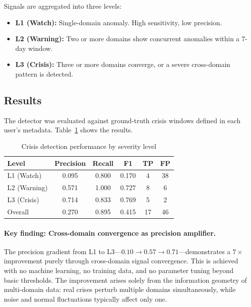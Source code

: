 \documentclass[11pt,a4paper]{article}
\begin{document}
Signals are aggregated into three levels:

\begin{itemize}[leftmargin=*,itemsep=2pt]
  \item \textbf{L1 (Watch):} Single-domain anomaly. High sensitivity,
    low precision.
  \item \textbf{L2 (Warning):} Two or more domains show concurrent
    anomalies within a 7-day window.
  \item \textbf{L3 (Crisis):} Three or more domains converge, or a
    severe cross-domain pattern is detected.
\end{itemize}

\subsection{Results}

The detector was evaluated against ground-truth crisis windows defined in
each user's metadata. Table~\ref{tab:crisis} shows the results.

\begin{table}[H]
\centering
\caption{Crisis detection performance by severity level}
\label{tab:crisis}
\begin{tabular}{lccccc}
\toprule
\textbf{Level} & \textbf{Precision} & \textbf{Recall} & \textbf{F1} & \textbf{TP} & \textbf{FP} \\
\midrule
L1 (Watch)   & 0.095 & 0.800 & 0.170 & 4  & 38 \\
L2 (Warning) & 0.571 & 1.000 & 0.727 & 8  & 6  \\
L3 (Crisis)  & 0.714 & 0.833 & 0.769 & 5  & 2  \\
\midrule
Overall      & 0.270 & 0.895 & 0.415 & 17 & 46 \\
\bottomrule
\end{tabular}
\end{table}

\paragraph{Key finding: Cross-domain convergence as precision amplifier.}
The precision gradient from L1 to L3---$0.10 \to 0.57 \to 0.71$---demonstrates
a $7\times$ improvement purely through cross-domain signal convergence. This is
achieved with no machine learning, no training data, and no parameter tuning
beyond basic thresholds. The improvement arises solely from the information
geometry of multi-domain data: real crises perturb multiple domains
simultaneously, while noise and normal fluctuations typically affect only one.
\end{document}
